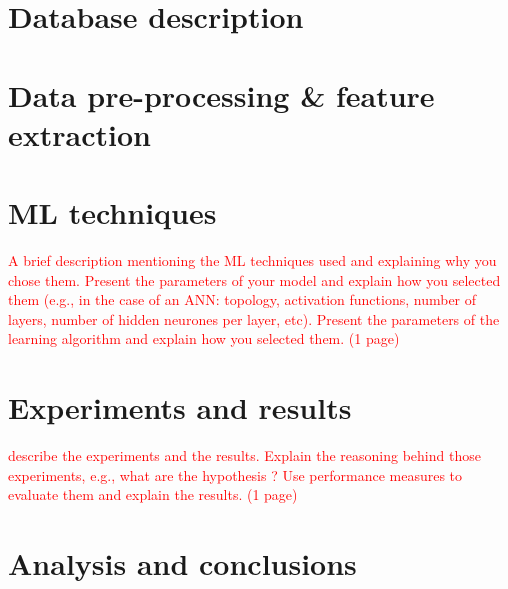 \documentclass[a4paper,11pt]{report}
\begin{document}
\chapter{Database description}
{\let\clearpage\relax \chapter{Data pre-processing \& feature extraction}}

\chapter{ML techniques}
\textcolor{red}{A brief description mentioning the ML techniques used and explaining why you chose them. Present the parameters of your model and explain how you selected them (e.g., in the case of an ANN: topology, activation functions, number of layers, number of hidden neurones per layer, etc). Present the parameters of the learning algorithm and explain how you selected them. (1 page)}


\chapter{Experiments and results}
\textcolor{red}{describe the experiments and the results. Explain the reasoning behind those experiments, e.g., what are the hypothesis ? Use performance measures to evaluate them and explain the results. (1 page)}

\chapter{Analysis and conclusions}
\end{document}
